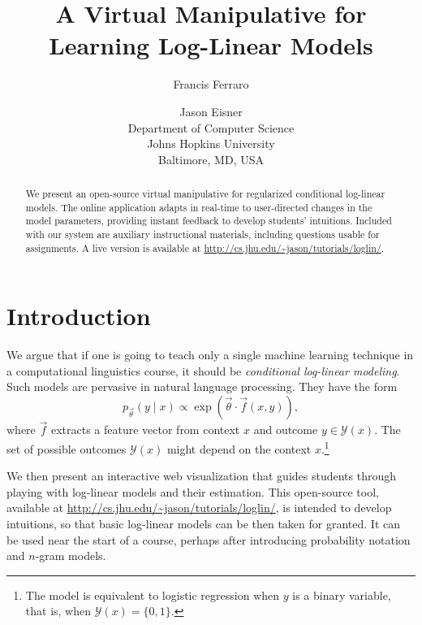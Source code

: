 \documentclass[11pt,letterpaper]{article}
\title{A Virtual Manipulative for Learning Log-Linear Models}
\author{
Francis Ferraro \and Jason Eisner\\
Department of Computer Science\\
Johns Hopkins University\\
Baltimore, MD, USA
}
\date{}
\newcommand{\WhereToFind}[0]{\url{http://cs.jhu.edu/~jason/tutorials/loglin/}}
\begin{document}
\maketitle

\begin{abstract}
We present an open-source virtual manipulative for regularized conditional 
log-linear models. The online application adapts in real-time to user-directed 
changes in the model parameters, providing instant feedback to develop 
students' intuitions. Included with our system are auxiliary instructional materials, 
including questions usable for assignments. A live version is available at
\WhereToFind{}.
\end{abstract}

\section{Introduction}\label{sec:intro}
We argue that if one is going to teach only a single machine learning
technique in a computational linguistics course, it should be {\em
  conditional log-linear modeling}.  Such models are pervasive in
natural language processing.  They have the form
\begin{equation}\label{eqn:loglin}
p_{\vec{\theta}}(y \mid x) \propto \exp{\left(\vec{\theta} \cdot \vec{f}\left(x,y\right)\right)},
\end{equation}
where $\vec{f}$ extracts a feature vector from context $x$ and
outcome $y \in \mathcal{Y}(x)$.  The set of possible
outcomes $\mathcal{Y}(x)$ might depend on the context
$x$.\footnote{The model is equivalent to logistic regression
  when $y$ is a binary variable, that is, when $\mathcal{Y}(x)=\{0,1\}$.}


We then present an interactive web visualization that guides students
through playing with log-linear models and their estimation. This open-source 
tool, available at \WhereToFind{}, is intended to develop intuitions, so that basic
log-linear models can be then taken for granted.  It can be used near
the start of a course, perhaps after introducing probability notation
and $n$-gram models. 
\end{document}
